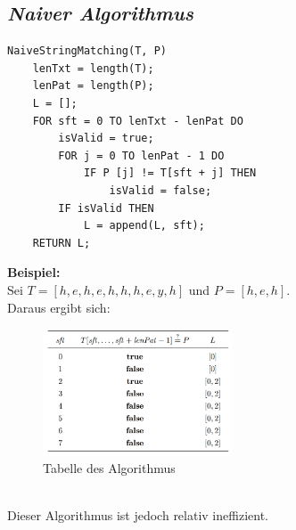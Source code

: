 \documentclass{article}
\begin{document}
        \subsection{\textit{Naiver Algorithmus}}
            \begin{lstlisting}[style=pseudocode]
NaiveStringMatching(T, P)
    lenTxt = length(T);
    lenPat = length(P);
    L = [];
    FOR sft = 0 TO lenTxt - lenPat DO
        isValid = true;
        FOR j = 0 TO lenPat - 1 DO
            IF P [j] != T[sft + j] THEN
                isValid = false;
        IF isValid THEN
            L = append(L, sft);
    RETURN L;
            \end{lstlisting}
            \textbf{Beispiel:}\\
            Sei $T= [h,e,h,e,h,h,h,e,y,h]$ und $P= [h,e,h]$.\\
            Daraus ergibt sich:
            \begin{figure}[ht]
                \centering
                \includegraphics[width=0.5\textwidth]{Bilder/StringMatching1.png}
                \caption{Tabelle des Algorithmus}
                \label{fig:StringMatching1}
            \end{figure}\\
            Dieser Algorithmus ist jedoch relativ ineffizient.
\end{document}
